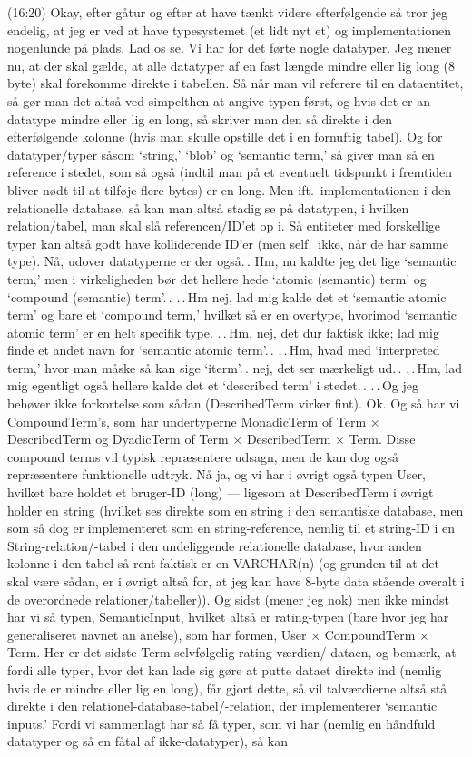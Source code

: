 \documentclass{report}
\begin{document}
(16:20) Okay, efter gåtur og efter at have tænkt videre efterfølgende så tror jeg endelig, at jeg er ved at have typesystemet (et lidt nyt et) og implementationen nogenlunde på plads. Lad os se. Vi har for det førte nogle datatyper. Jeg mener nu, at der skal gælde, at alle datatyper af en fast længde mindre eller lig long (8 byte) skal forekomme direkte i tabellen. Så når man vil referere til en dataentitet, så gør man det altså ved simpelthen at angive typen først, og hvis det er an datatype mindre eller lig en long, så skriver man den så direkte i den efterfølgende kolonne (hvis man skulle opstille det i en fornuftig tabel). Og for datatyper/typer såsom `string,' `blob' og `semantic term,' så giver man så en reference i stedet, som så også (indtil man på et eventuelt tidspunkt i fremtiden bliver nødt til at tilføje flere bytes) er en long. Men ift.\ implementationen i den relationelle database, så kan man altså stadig se på datatypen, i hvilken relation/tabel, man skal slå referencen/ID'et op i. Så entiteter med forskellige typer kan altså godt have kolliderende ID'er (men self.\ ikke, når de har samme type). Nå, udover datatyperne er der også.\,. Hm, nu kaldte jeg det lige `semantic term,' men i virkeligheden bør det hellere hede `atomic (semantic) term' og `compound (semantic) term'.\,. .\,.\,Hm nej, lad mig kalde det et `semantic atomic term' og bare et `compound term,' hvilket så er en overtype, hvorimod `semantic atomic term' er en helt specifik type. .\,.\,Hm, nej, det dur faktisk ikke; lad mig finde et andet navn for `semantic atomic term'.\,. .\,.\,Hm, hvad med `interpreted term,' hvor man måske så kan sige `iterm'.\,. nej, det ser mærkeligt ud.\,. .\,.\,Hm, lad mig egentligt også hellere kalde det et `described term' i stedet.\,. .\,.\,Og jeg behøver ikke forkortelse som sådan (DescribedTerm virker fint). Ok. Og så har vi CompoundTerm's, som har undertyperne MonadicTerm of Term $\times$ DescribedTerm og DyadicTerm of  Term $\times$ DescribedTerm $\times$ Term. Disse compound terms vil typisk repræsentere udsagn, men de kan dog også repræsentere funktionelle udtryk. Nå ja, og vi har i øvrigt også typen User, hvilket bare holdet et bruger-ID (long) --- ligesom at DescribedTerm i øvrigt holder en string (hvilket ses direkte som en string i den semantiske database, men som så dog er implementeret som en string-reference, nemlig til et string-ID i en String-relation/-tabel i den undeliggende relationelle database, hvor anden kolonne i den tabel så rent faktisk er en VARCHAR(n) (og grunden til at det skal være sådan, er i øvrigt altså for, at jeg kan have 8-byte data stående overalt i de overordnede relationer/tabeller)). Og sidst (mener jeg nok) men ikke mindst har vi så typen, SemanticInput, hvilket altså er rating-typen (bare hvor jeg har generaliseret navnet an anelse), som har formen, User $\times$ CompoundTerm $\times$ Term. Her er det sidste Term selvfølgelig rating-værdien/-dataen, og bemærk, at fordi alle typer, hvor det kan lade sig gøre at putte dataet direkte ind (nemlig hvis de er mindre eller lig en long), får gjort dette, så vil talværdierne altså stå direkte i den relationel-database-tabel/-relation, der implementerer `semantic inputs.' Fordi vi sammenlagt har så få typer, som vi har (nemlig en håndfuld datatyper og så en fåtal af ikke-datatyper), så kan 
\end{document}
